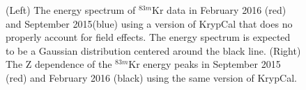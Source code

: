 \documentclass[a4paper,12pt]{article}
\begin{document}
{\begin{figure} [h!]
\centering
{}
\qquad
{}
\caption{ (Left) The energy spectrum of $^{83m}$Kr data in February 2016 (red) and September 2015(blue) using a version of KrypCal that does no properly account for field effects. The energy spectrum is expected to be a Gaussian distribution centered around the black line.  (Right) The Z dependence of the $^{83m}$Kr energy peaks in September 2015 (red) and February 2016 (black) using the same version of KrypCal.}
\label{BadKrypCalKr}
\end{figure}


}
\end{document}
